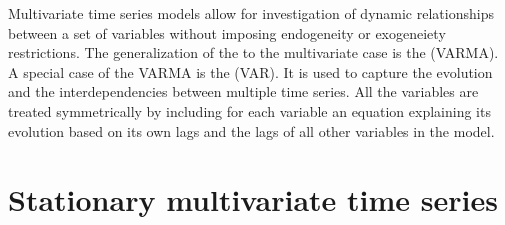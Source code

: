 \ChapterHeading

Multivariate time series models allow for investigation of dynamic relationships between a set of variables without imposing endogeneity or exogeneiety restrictions.
The generalization of the  to the multivariate case is the  (VARMA).
A special case of the VARMA is the  (VAR).
It is used to capture the evolution and the interdependencies between multiple time series.
All the variables are treated symmetrically by including for each variable an equation explaining its evolution based on its own lags and the lags of all other variables in the model.

\section{Stationary multivariate time series}

